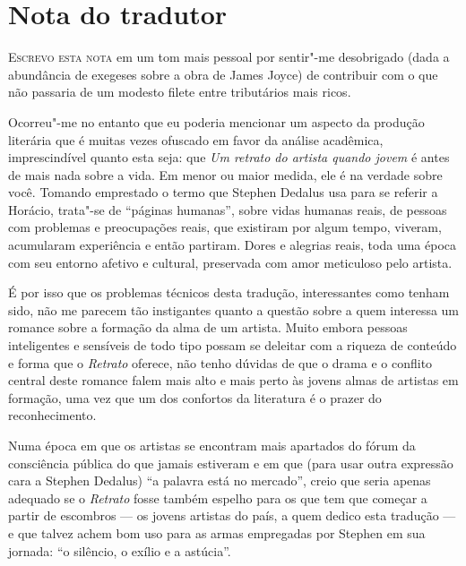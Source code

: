 \chapter[Nota do tradutor]{Nota do tradutor}

\vspace*{2em}

\noindent \textsc{Escrevo esta nota} em um tom mais pessoal por sentir"-me desobrigado 
(dada a abundância de exegeses sobre a obra de James Joyce) de contribuir 
com o que não passaria de um modesto filete entre tributários mais ricos.

Ocorreu"-me no entanto que eu poderia mencionar um aspecto da produção literária 
que é muitas vezes ofuscado em favor da análise acadêmica, imprescindível 
quanto esta seja: que \textit{Um retrato do artista quando jovem} é antes 
de mais nada sobre a vida.  Em menor ou maior medida, ele é na verdade sobre você. 
Tomando emprestado o termo que Stephen Dedalus usa 
para se referir a Horácio, trata"-se de ``páginas humanas'', sobre vidas 
humanas reais, de pessoas com problemas e preocupações reais, que existiram por algum tempo, viveram, acumularam experiência 
e então partiram. Dores e alegrias reais, toda uma época com seu 
entorno afetivo e cultural, preservada com amor meticuloso pelo artista.

É por isso que os problemas técnicos desta tradução, interessantes 
como tenham sido, não me parecem tão instigantes quanto a questão 
sobre a quem interessa um romance sobre a formação da alma de um artista. 
Muito embora pessoas inteligentes e sensíveis de todo tipo possam se deleitar com a riqueza de conteúdo e forma que o 
\textit{Retrato} oferece, não tenho dúvidas de que o drama e o conflito central 
deste romance falem mais alto e mais perto às jovens almas de artistas em formação, 
uma vez que um dos confortos da literatura é o prazer do reconhecimento.

Numa época em que os artistas se encontram mais apartados do fórum da 
consciência pública do que jamais estiveram e em que (para usar outra
expressão cara a Stephen Dedalus) ``a palavra está no mercado'', creio 
que seria apenas adequado se o \textit{Retrato} fosse também espelho para 
os que tem que começar a partir de escombros — os jovens artistas do 
país, a quem dedico esta tradução --- e que talvez achem bom uso para as 
armas empregadas por Stephen em sua jornada: ``o silêncio, o exílio e a astúcia''.

\thispagestyle{empty}

\medskip

